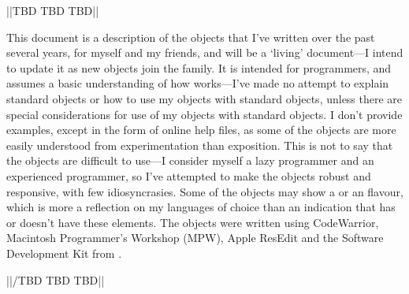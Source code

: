 
||TBD TBD TBD||

This document is a description of the \MaxName{} objects that I've written over the past
several years, for myself and my friends, and will be a `living' document---I intend to update it as new objects join the family.
It is intended for \MaxName{} programmers, and assumes a basic understanding of how \MaxName{} works---I've made no attempt to explain
standard \MaxName{} objects or how to use my objects with standard \MaxName{} objects, unless there are special considerations for use
of my objects with standard \MaxName{} objects.
I don't provide examples, except in the form of online help files, as some of the objects are more easily understood from
experimentation than exposition.
This is not to say that the objects are difficult to use---I consider myself a lazy \MaxName{} programmer and an experienced
 programmer, so I've attempted to make the objects robust and responsive, with few idiosyncrasies.
Some of the objects may show a  or an  flavour, which is more a reflection on
my languages of choice than an indication that \MaxName{} has or doesn't have these elements.
The objects were written using  CodeWarrior,
 Macintosh Programmer's Workshop (MPW), Apple ResEdit\texttrademark{} and the
\MaxName{} Software Development Kit from .

||/TBD TBD TBD||






